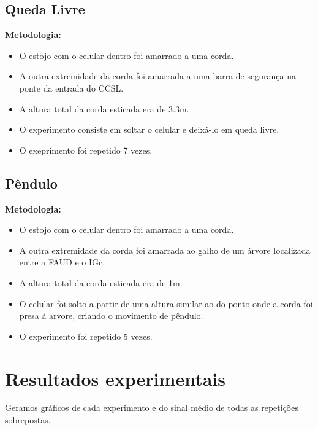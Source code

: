 \documentclass{article}
\begin{document}
\subsection{Queda Livre}
\textbf{Metodologia:}
\begin{itemize}
    \item O estojo com o celular dentro foi amarrado a uma corda.
    \item A outra extremidade da corda foi amarrada a uma barra de segurança na ponte da entrada do CCSL.
    \item A altura total da corda esticada era de 3.3m.
    \item O experimento consiste em soltar o celular e deixá-lo em queda livre.
    \item O exeprimento foi repetido 7 vezes.
\end{itemize}

\subsection{Pêndulo}
\textbf{Metodologia:}
\begin{itemize}
    \item O estojo com o celular dentro foi amarrado a uma corda.
    \item A outra extremidade da corda foi amarrada ao galho de um árvore localizada entre a FAUD e o IGc.
    \item A altura total da corda esticada era de 1m.
    \item O celular foi solto a partir de uma altura similar ao do ponto onde a corda foi presa à arvore, criando o movimento de pêndulo.
    \item O experimento foi repetido 5 vezes.
\end{itemize}

\section{Resultados experimentais}
Geramos gráficos de cada experimento e do sinal médio de todas as repetições sobrepostas.
\end{document}
